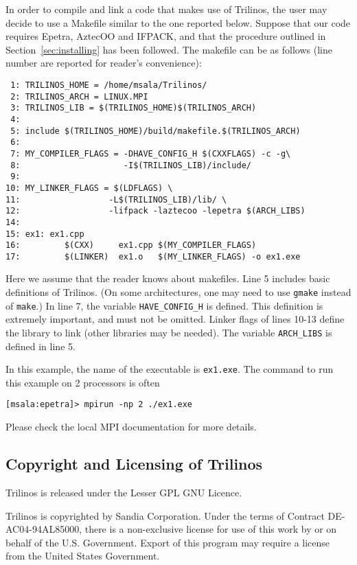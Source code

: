 In order to compile and link a code that makes use of Trilinos, the user
may decide to use a Makefile similar to the one reported below.  Suppose
that our code requires Epetra, AztecOO and IFPACK, and that the
procedure outlined in Section~\ref{sec:installing} has been followed.
The makefile can be as follows (line number are reported for
reader's convenience):
\begin{verbatim}
 1: TRILINOS_HOME = /home/msala/Trilinos/
 2: TRILINOS_ARCH = LINUX.MPI
 3: TRILINOS_LIB = $(TRILINOS_HOME)$(TRILINOS_ARCH)
 4: 
 5: include $(TRILINOS_HOME)/build/makefile.$(TRILINOS_ARCH)
 6: 
 7: MY_COMPILER_FLAGS = -DHAVE_CONFIG_H $(CXXFLAGS) -c -g\
 8:                     -I$(TRILINOS_LIB)/include/
 9:
10: MY_LINKER_FLAGS = $(LDFLAGS) \
11:                  -L$(TRILINOS_LIB)/lib/ \
12:                  -lifpack -laztecoo -lepetra $(ARCH_LIBS)
14:
15: ex1: ex1.cpp
16:         $(CXX)     ex1.cpp $(MY_COMPILER_FLAGS)
17:         $(LINKER)  ex1.o   $(MY_LINKER_FLAGS) -o ex1.exe
\end{verbatim}
Here we assume that the reader knows about makefiles.  Line 5
includes basic definitions of Trilinos. (On some architectures, one may
need to use \verb!gmake! instead of \verb!make!.)  In line 7, the
variable \verb!HAVE_CONFIG_H! is defined.  This definition is extremely
important, and must not be omitted.  Linker flags of lines 10-13 define
the library to link (other libraries may be needed).  The variable
\verb!ARCH_LIBS! is defined in line 5.

In this example, the name of the executable is \verb!ex1.exe!.  The
command to run this example on 2 processors is often
\begin{verbatim}
[msala:epetra]> mpirun -np 2 ./ex1.exe
\end{verbatim}
Please check the local MPI documentation for more details. 


\subsection{Copyright and Licensing of Trilinos}
\label{sec:copyright}

Trilinos is released under the Lesser GPL GNU Licence.

Trilinos is copyrighted by Sandia Corporation. Under the terms of
Contract DE-AC04-94AL85000, there is a non-exclusive license for use of
this work by or on behalf of the U.S. Government.  Export of this
program may require a license from the United States Government.

